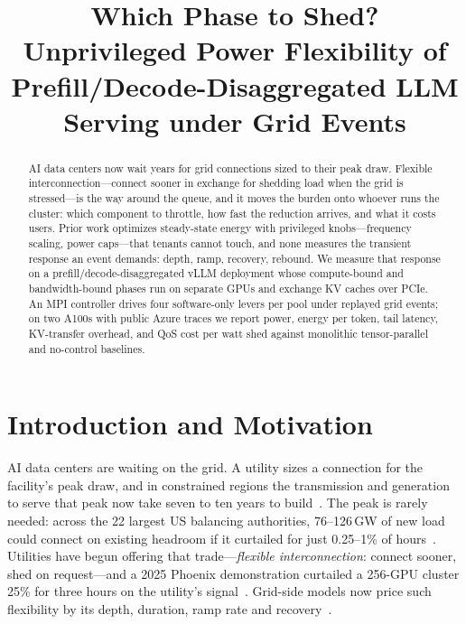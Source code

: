\documentclass[conference,10pt]{IEEEtran}
\begin{document}
\title{Which Phase to Shed? Unprivileged Power Flexibility of Prefill/Decode-Disaggregated LLM Serving under Grid Events}

\author{
}

\maketitle

\begin{abstract}
AI data centers now wait years for grid connections sized to their peak draw. Flexible interconnection---connect sooner in exchange for shedding load when the grid is stressed---is the way around the queue, and it moves the burden onto whoever runs the cluster: which component to throttle, how fast the reduction arrives, and what it costs users. Prior work optimizes steady-state energy with privileged knobs---frequency scaling, power caps---that tenants cannot touch, and none measures the transient response an event demands: depth, ramp, recovery, rebound. We measure that response on a prefill/decode-disaggregated vLLM deployment whose compute-bound and bandwidth-bound phases run on separate GPUs and exchange KV caches over PCIe. An MPI controller drives four software-only levers per pool under replayed grid events; on two A100s with public Azure traces we report power, energy per token, tail latency, KV-transfer overhead, and QoS cost per watt shed against monolithic tensor-parallel and no-control baselines.
\end{abstract}

\section{Introduction and Motivation}
AI data centers are waiting on the grid. A utility sizes a connection for the facility's peak draw, and in constrained regions the transmission and generation to serve that peak now take seven to ten years to build~\cite{norris2025rethinking}. The peak is rarely needed: across the 22 largest US balancing authorities, 76--126\,GW of new load could connect on existing headroom if it curtailed for just 0.25--1\% of hours~\cite{norris2025rethinking}. Utilities have begun offering that trade---\emph{flexible interconnection}: connect sooner, shed on request---and a 2025 Phoenix demonstration curtailed a 256-GPU cluster 25\% for three hours on the utility's signal~\cite{colangelo2025phoenix}. Grid-side models now price such flexibility by its depth, duration, ramp rate and recovery~\cite{khanal2026shift}.
\end{document}
